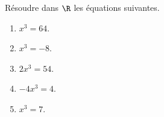 
Résoudre dans $\R$ les équations suivantes.
 \begin{enumerate}
 \item $x^3=64$.
  \item  $x^3=-8$.
   \item $2x^3=54$.
    \item $-4x^3=4$.
     \item $x^3=7$.   
 \end{enumerate}

